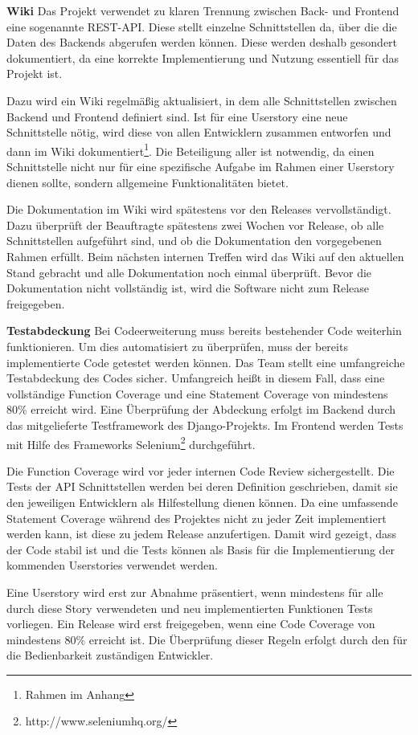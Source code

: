 \documentclass[accentcolor=tud0b,12pt,paper=a4]{tudreport}
\begin{document}
\textbf{Wiki}
Das Projekt verwendet zu klaren Trennung zwischen Back- und Frontend eine sogenannte REST-API. Diese stellt einzelne Schnittstellen da, über die die Daten des Backends abgerufen werden können. Diese werden deshalb gesondert dokumentiert, da eine korrekte Implementierung und Nutzung essentiell für das Projekt ist. 

Dazu wird ein Wiki regelmäßig aktualisiert, in dem alle Schnittstellen zwischen Backend und Frontend definiert sind. Ist für eine Userstory eine neue Schnittstelle nötig, wird diese von allen Entwicklern zusammen entworfen und dann im Wiki dokumentiert\footnote{Rahmen im Anhang}. Die Beteiligung aller ist notwendig, da einen Schnittstelle nicht nur für eine spezifische Aufgabe im Rahmen einer Userstory dienen sollte, sondern allgemeine Funktionalitäten bietet.

Die Dokumentation im Wiki wird spätestens vor den Releases vervollständigt. Dazu überprüft der Beauftragte spätestens zwei Wochen vor Release, ob alle Schnittstellen aufgeführt sind, und ob die Dokumentation den vorgegebenen Rahmen erfüllt. Beim nächsten internen Treffen wird das Wiki auf den aktuellen Stand gebracht und alle Dokumentation noch einmal überprüft. Bevor die Dokumentation nicht vollständig ist, wird die Software nicht zum Release freigegeben.


\textbf{Testabdeckung}
Bei Codeerweiterung muss bereits bestehender Code weiterhin funktionieren. Um dies automatisiert zu überprüfen, muss der bereits implementierte Code getestet werden können. Das Team stellt eine umfangreiche Testabdeckung des Codes sicher. Umfangreich heißt in diesem Fall, dass eine vollständige Function Coverage und eine Statement Coverage von mindestens 80\% erreicht wird. Eine Überprüfung der Abdeckung erfolgt im Backend durch das mitgelieferte Testframework des Django-Projekts. Im Frontend werden Tests mit Hilfe des Frameworks Selenium\footnote{http://www.seleniumhq.org/} durchgeführt.

Die Function Coverage wird vor jeder internen Code Review sichergestellt. Die Tests der API Schnittstellen werden bei deren Definition geschrieben, damit sie den jeweiligen Entwicklern als Hilfestellung dienen können. Da eine umfassende Statement Coverage während des Projektes nicht zu jeder Zeit implementiert werden kann, ist diese zu jedem Release anzufertigen. Damit wird gezeigt, dass der Code stabil ist und die Tests können als Basis für die Implementierung der kommenden Userstories verwendet werden.

Eine Userstory wird erst zur Abnahme präsentiert, wenn mindestens für alle durch diese Story verwendeten und neu implementierten Funktionen Tests vorliegen. Ein Release wird erst freigegeben, wenn eine Code Coverage von mindestens 80\% erreicht ist. Die Überprüfung dieser Regeln erfolgt durch den für die Bedienbarkeit zuständigen Entwickler.
\end{document}
